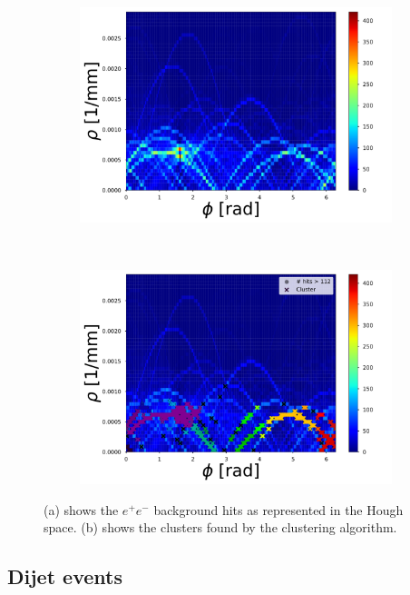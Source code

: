 \begin{figure}[ht]
	\centering
	\begin{subfigure}[b]{0.48\textwidth}
        \includegraphics[width=\textwidth]{figures/HT_background.pdf}
        \caption{}

    \end{subfigure}
		~ %
		\begin{subfigure}[b]{0.48\textwidth}
					\includegraphics[width=\textwidth]{figures/HT_background_maxima.pdf}
					\caption{}
			\end{subfigure}
	\label{fig_bcg_HT}
	\caption{(a) shows the $e^+e^-$ background hits as represented in the Hough space. (b) shows the clusters found by the clustering algorithm.}
\end{figure}


\subsection{Dijet events}

